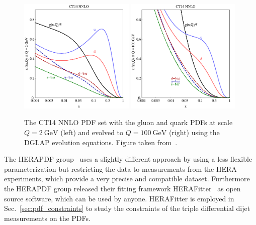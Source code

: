 \begin{figure}[htb] 
    \centering
    \includegraphics[width=0.49\textwidth]{figures/sm_model/ct14_2.pdf}\hfill
    \includegraphics[width=0.49\textwidth]{figures/sm_model/ct14_100.pdf}
    \caption[CT14 NNLO PDF sets]{The CT14 NNLO PDF set with the gluon and quark
        PDFs at scale $Q=\SI{2}{\GeV}$ (left) and evolved to $Q=\SI{100}{\GeV}$
    (right) using the DGLAP evolution equations. Figure taken
    from~\cite{Dulat:2015mca}.}
    \label{fig:ct14_parton_distributions} 
\end{figure}

The HERAPDF group~\cite{Abramowicz:2015mha} uses a slightly different approach
by using a less flexible parameterization but restricting the data to
measurements from the HERA experiments, which provide a very precise and compatible dataset. Furthermore the HERAPDF group released their fitting
framework HERAFitter~\cite{Alekhin:2014irh} as open source software, which can
be used by anyone.  HERAFitter is employed in Sec.~\ref{sec:pdf_constraints} to
study the constraints of the triple differential dijet measurements on the PDFs.

